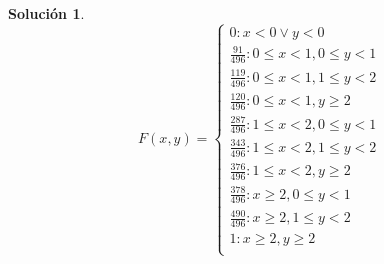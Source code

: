 \documentclass[11pt, a4paper]{article}
\newif\IfInSansMode
\theoremstyle{theorem-style}
\theoremstyle{definition-style}
\theoremstyle{remark-style}
\newtheorem*{sol}{Solución}
\theoremstyle{example-style}
\begin{document}
\begin{sol}
\begin{equation}
F(x,y) = \left\lbrace
\begin{array}{ll}
0 : x < 0 \lor y < 0\\
\frac{91}{496} : 0 \le x < 1, 0 \le y < 1\\
\frac{119}{496} : 0 \le x < 1, 1 \le y < 2\\
\frac{120}{496} : 0 \le x < 1, y \ge 2\\
\frac{287}{496} : 1 \le x < 2, 0 \le y < 1\\
\frac{343}{496} : 1 \le x < 2, 1 \le y < 2\\
\frac{376}{496} : 1 \le x < 2, y \ge 2\\
\frac{378}{496} : x \ge 2, 0 \le y < 1\\
\frac{490}{496} : x \ge 2, 1 \le y < 2\\
1 : x \ge 2, y \ge 2 \\
\end{array}
\right.
\end{equation}
	
\end{sol}



\end{document}
